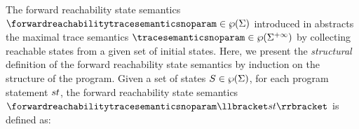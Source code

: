
The forward reachability state semantics $\forwardreachabilitytracesemanticsnoparam\in\forwardreachabilitytracetype$ introduced in  abstracts the maximal trace semantics $\tracesemanticsnoparam\in\tracetype$ by collecting reachable states from a given set of initial states.
Here, we present the \emph{structural} definition of the forward reachability state semantics by induction on the structure of the program.
Given a set of states $S\in\wp(\Sigma)$, for each program statement $st$, the forward reachability state semantics $\forwardreachabilitytracesemanticsnoparam\semanticsof{\defstmt}$ is defined as:

